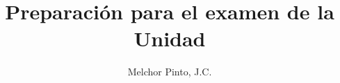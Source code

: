 \documentclass[12pt,addpoints]{repaso}
\title{Preparación para el examen de la Unidad}
\author{Melchor Pinto, J.C.}
\begin{document}
\INFO%
\begin{questions}
    \questionboxed[10]{}
    \ejemplosboxed[]
    \questionboxed[10]{}
    \questionboxed[4]{}
    \questionboxed[4]{}
    \questionboxed[4]{}
    \ejemplosboxed[]
    \questionboxed[20]{}
    \ejemplosboxed[]
    \questionboxed[5]{}
    \ejemplosboxed[]
    \questionboxed[5]{}
    \questionboxed[4]{}
    \questionboxed[4]{}
    \questionboxed[30]{}
\end{questions}
\end{document}
